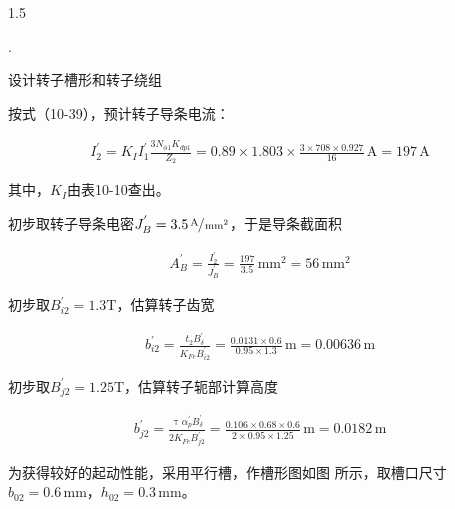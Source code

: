 \documentclass[a4paper,11pt]{ctexart}
\newcommand{\A}{\,\text{A}}
\newcommand{\m}{\,\text{m}}
\newcommand{\mm}{\,\text{mm}}
\newcommand{\T}{\text{T}}
\newenvironment{shrinkeq}[2]
{
	\bgroup
	\addtolength\abovedisplayshortskip{#1}
	\addtolength\abovedisplayskip{#1}
	\addtolength\belowdisplayshortskip{#2}
	\addtolength\belowdisplayskip{#2}
}
{
	\egroup
	\ignorespacesafterend
}
\newcounter{designitem}
\newcommand{\entry}
{
	\vspace{0.5em}
	\par
	\stepcounter{designitem}
	\thedesignitem.
}
\begin{document}
\begin{spacing}{1.5}
\entry
设计转子槽形和转子绕组
\par
按式（10-39），预计转子导条电流：
\begin{shrinkeq}{-1.5ex}{-1.5ex}
	\begin{align}
	I_{2}^{'} = K_{I}I_{1}^{'}\frac{3N_{\phi 1}K_{dp1}}{Z_2} =0.89\times 1.803\times \frac{3\times 708\times 0.927}{16}\A = 197\A
	\end{align}
\end{shrinkeq}
其中，$K_{I}$由表10-10查出。
\par
初步取转子导条电密$J_{B}^{'} = 3.5\sfrac{\A}{\mm^2}$，于是导条截面积
\begin{shrinkeq}{-1.5ex}{-1ex}
	\begin{align}
	A_{B}^{'}=\frac{I_{2}^{'}}{J_{B}^{'}} = \frac{197}{3.5}\mm^2 = 56\mm^2
	\end{align}
\end{shrinkeq}
\par
初步取$B_{i2}^{'} = 1.3\T$，估算转子齿宽
\begin{shrinkeq}{-1.5ex}{-1ex}
	\begin{align}
	b_{i2}^{'} = \frac{t_2B_{\delta}^{'}}{K_{Fe}B_{i2}^{'}}=\frac{0.0131\times 0.6}{0.95\times 1.3}\m = 0.00636\m
	\end{align}
\end{shrinkeq}
初步取$B_{j2}^{'} = 1.25\T$，估算转子轭部计算高度
\begin{shrinkeq}{-1.5ex}{-1.5ex}
	\begin{align}
	b_{j2}^{'} = \frac{\uptau \alpha_{p}^{'}B_{\delta}^{'}}{2K_{Fe}B_{j2}^{'}}=\frac{0.106\times 0.68\times 0.6}{2\times 0.95\times 1.25}\m = 0.0182\m
	\end{align}
\end{shrinkeq}
为获得较好的起动性能，采用平行槽，作槽形图如图 所示，取槽口尺寸$b_{02} = 0.6\mm$，$h_{02} = 0.3\mm$。


\end{spacing}
\end{document}
